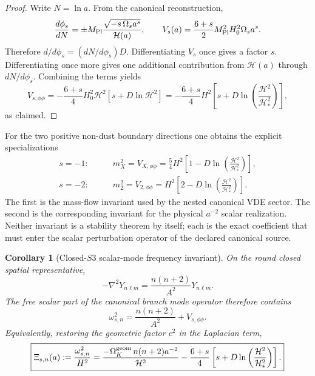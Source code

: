 \documentclass[11pt,a4paper]{article}
\def\Sthree{S3}%
\def\dd{d}%
\def\Dil{D}%
\numberwithin{equation}{section}
\theoremstyle{definition}
\theoremstyle{plain}
\newtheorem{corollary}[criterion]{Corollary}
\theoremstyle{remark}
\newcommand{\Sthree}{S^3}
\newcommand{\Dil}{\mathscr{D}}
\newcommand{\dd}{\mathrm{d}}
\begin{document}
\begin{proof}
Write \(N=\ln a\).  From the canonical reconstruction,
\begin{equation}
\frac{\dd\phi_s}{\dd N}
=
\pm M_{\rm Pl}\frac{\sqrt{-s\,\Omega_s a^s}}{\mathcal H(a)},
\qquad
V_s(a)=\frac{6+s}{2}M_{\rm Pl}^2H_0^2\Omega_s a^s.
\end{equation}
Therefore \(\dd/\dd\phi_s=(\dd N/\dd\phi_s)\Dil\).  Differentiating \(V_s\) once gives a factor \(s\).  Differentiating once more gives one additional contribution from \(\mathcal H(a)\) through \(\dd N/\dd\phi_s\).  Combining the terms yields
\begin{equation}
V_{s,\phi\phi}
=-\frac{6+s}{4}H_0^2\mathcal H^2
\left[s+\Dil\ln \mathcal H^2\right]
=-\frac{6+s}{4}H^2
\left[s+\Dil\ln\left(\frac{\mathcal H^2}{\mathcal H_*^2}\right)\right],
\end{equation}
as claimed.
\end{proof}

For the two positive non-dust boundary directions one obtains the explicit specializations
\begin{align}
s=-1:\qquad
&\boxed{
 m_X^2
 =V_{X,\phi\phi}
 =\frac54H^2
 \left[1-\Dil\ln\left(\frac{\mathcal H^2}{\mathcal H_*^2}\right)\right],
}
\label{eq:X-mass-invariant}\\[1mm]
s=-2:\qquad
&\boxed{
 m_2^2
 =V_{2,\phi\phi}
 =H^2
 \left[2-\Dil\ln\left(\frac{\mathcal H^2}{\mathcal H_*^2}\right)\right].
}
\label{eq:sminus2-mass-invariant}
\end{align}
The first is the mass-flow invariant used by the nested canonical VDE sector.  The second is the corresponding invariant for the physical \(a^{-2}\) scalar realization.  Neither invariant is a stability theorem by itself; each is the exact coefficient that must enter the scalar perturbation operator of the declared canonical source.

\begin{corollary}[Closed-\(\Sthree\) scalar-mode frequency invariant]
\label{cor:closed-s3-scalar-frequency}
On the round closed spatial representative,
\begin{equation}
-\nabla^2Y_{n\ell m}
=
\frac{n(n+2)}{A^2}Y_{n\ell m}.
\end{equation}
The free scalar part of the canonical branch mode operator therefore contains
\begin{equation}
\boxed{
\omega_{s,n}^2
=
\frac{n(n+2)}{A^2}+V_{s,\phi\phi}.
}
\end{equation}
Equivalently, restoring the geometric factor \(c^2\) in the Laplacian term,
\begin{equation}
\boxed{
\Xi_{s,n}(a)
:=
\frac{\omega_{s,n}^2}{H^2}
=
\frac{-\Omega_K^{\rm geom}\,n(n+2)a^{-2}}{\mathcal H^2}
-\frac{6+s}{4}
\left[
 s+\Dil\ln\left(\frac{\mathcal H^2}{\mathcal H_*^2}\right)
\right].
}
\label{eq:Xi-s-n}
\end{equation}
\end{corollary}
\end{document}
